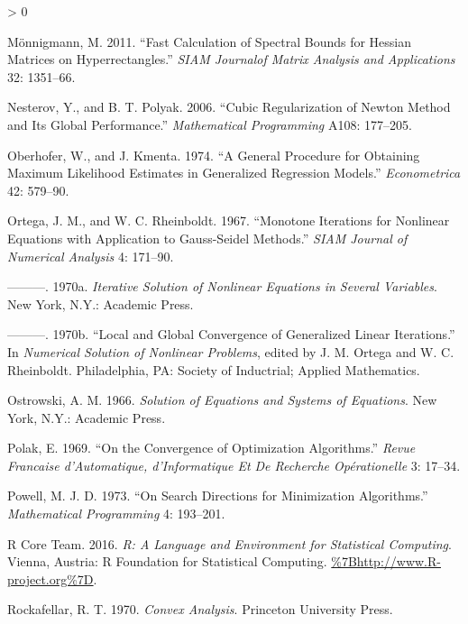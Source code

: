 \documentclass[
  12pt,
]{book}
\newlength{\cslhangindent}
\newenvironment{CSLReferences}[2] %
 {%
  \setlength{\parindent}{0pt}
  \ifodd #1 \everypar{\setlength{\hangindent}{\cslhangindent}}\ignorespaces\fi
  \ifnum #2 > 0
  \setlength{\parskip}{#2\baselineskip}
  \fi
 }%
 {}
\begin{document}
\begin{CSLReferences}{1}{0}
\leavevmode\hypertarget{ref-monnigmann_11}{}%
Mönnigmann, M. 2011. {``Fast Calculation of Spectral Bounds for Hessian Matrices on Hyperrectangles.''} \emph{SIAM Journalof Matrix Analysis and Applications} 32: 1351--66.

\leavevmode\hypertarget{ref-nesterov_polyak_06}{}%
Nesterov, Y., and B. T. Polyak. 2006. {``Cubic Regularization of Newton Method and Its Global Performance.''} \emph{Mathematical Programming} A108: 177--205.

\leavevmode\hypertarget{ref-oberhofer_kmenta_74}{}%
Oberhofer, W., and J. Kmenta. 1974. {``{A General Procedure for Obtaining Maximum Likelihood Estimates in Generalized Regression Models}.''} \emph{Econometrica} 42: 579--90.

\leavevmode\hypertarget{ref-ortega_rheinboldt_67}{}%
Ortega, J. M., and W. C. Rheinboldt. 1967. {``{Monotone Iterations for Nonlinear Equations with Application to {Gauss-Seidel} Methods}.''} \emph{{SIAM} Journal of Numerical Analysis} 4: 171--90.

\leavevmode\hypertarget{ref-ortega_rheinboldt_70b}{}%
---------. 1970a. \emph{{Iterative Solution of Nonlinear Equations in Several Variables}}. New York, N.Y.: Academic Press.

\leavevmode\hypertarget{ref-ortega_rheinboldt_70a}{}%
---------. 1970b. {``{Local and Global Convergence of Generalized Linear Iterations}.''} In \emph{Numerical Solution of Nonlinear Problems}, edited by J. M. Ortega and W. C. Rheinboldt. Philadelphia, {PA}: Society of Inductrial; Applied Mathematics.

\leavevmode\hypertarget{ref-ostrowski_66}{}%
Ostrowski, A. M. 1966. \emph{{Solution of Equations and Systems of Equations}}. New York, N.Y.: Academic Press.

\leavevmode\hypertarget{ref-polak_69}{}%
Polak, E. 1969. {``{On the Convergence of Optimization Algorithms}.''} \emph{Revue Francaise d'Automatique, d'Informatique Et De Recherche Opérationelle} 3: 17--34.

\leavevmode\hypertarget{ref-powell_73}{}%
Powell, M. J. D. 1973. {``{On Search Directions for Minimization Algorithms}.''} \emph{Mathematical Programming} 4: 193--201.

\leavevmode\hypertarget{ref-r_core_16}{}%
R Core Team. 2016. \emph{{R: A Language and Environment for Statistical Computing}}. {Vienna, Austria}: {R Foundation for Statistical Computing}. \url{\%7Bhttp://www.R-project.org\%7D}.

\leavevmode\hypertarget{ref-rockafellar_70}{}%
Rockafellar, R. T. 1970. \emph{Convex Analysis}. Princeton University Press.


\end{CSLReferences}
\end{document}
